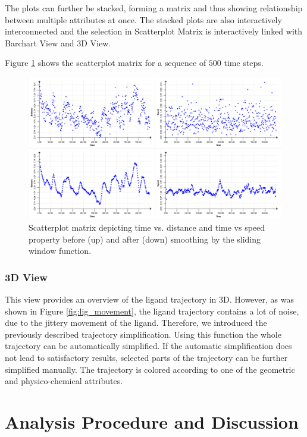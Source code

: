 \documentclass[twocolumn]{bmcart}%
\begin{document}
The plots can further be stacked, forming a matrix and thus showing relationship between multiple attributes at once.
The stacked plots are also interactively interconnected and the selection in Scatterplot Matrix is interactively linked with Barchart View and 3D View.

Figure \ref{fig:scatterplot} shows the scatterplot matrix for a sequence of $500$ time steps.

\begin{figure}[htb]
	\centering
  \includegraphics[width=0.95\linewidth]{img/scatterplot.png}
  \caption{\label{fig:scatterplot} Scatterplot matrix depicting time vs. distance and time vs speed property before (up) and after (down) smoothing by the sliding window function.}
\end{figure}

\subsubsection*{3D View}
This view provides an overview of the ligand trajectory in 3D.
However, as was shown in Figure \ref{fig:lig_movement}, the ligand trajectory contains a lot of noise, due to the jittery movement of the ligand.
Therefore, we introduced the previously described trajectory simplification.
Using this function the whole trajectory can be automatically simplified.
If the automatic simplification does not lead to satisfactory results, selected parts of the trajectory can be further simplified manually.
The trajectory is colored according to one of the geometric and physico-chemical attributes. 

\section*{Analysis Procedure and Discussion}
\end{document}
